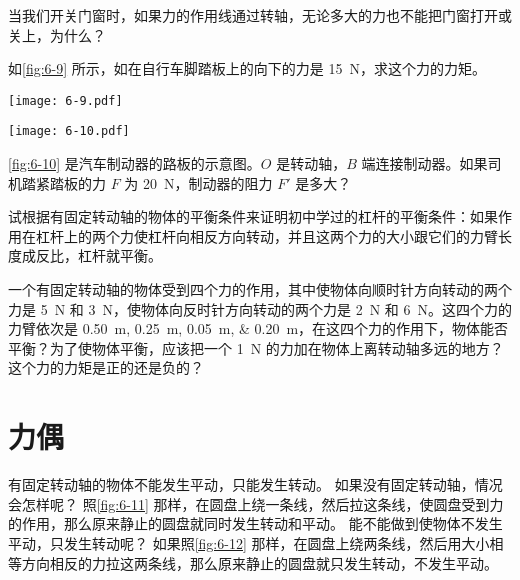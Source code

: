 \begin{Practice}
\begin{question}
  \item 当我们开关门窗时，如果力的作用线通过转轴，无论多大的力也不能把门窗打开或关上，为什么？
  \item 如\cref{fig:6-9} 所示，如在自行车脚踏板上的向下的力是 \qty{15}{N}，求这个力的力矩。
  \begin{figurehere}
  \begin{minipage}[b]{0.58\linewidth}\centering
    \texttt{[image: 6-9.pdf]}
    \caption{}\label{fig:6-9}
  \end{minipage}
  \begin{minipage}[b]{0.38\linewidth}\centering
    \texttt{[image: 6-10.pdf]}
    \caption{}\label{fig:6-10}
  \end{minipage}
  \end{figurehere}
  \item \cref{fig:6-10} 是汽车制动器的路板的示意图。$O$ 是转动轴，$B$ 端连接制动器。如果司机踏紧踏板的力 $F$ 为 \qty{20}{N}，制动器的阻力 $F'$ 是多大？
  \item 试根据有固定转动轴的物体的平衡条件来证明初中学过的杠杆的平衡条件：如果作用在杠杆上的两个力使杠杆向相反方向转动，并且这两个力的大小跟它们的力臂长度成反比，杠杆就平衡。
  \item 一个有固定转动轴的物体受到四个力的作用，其中使物体向顺时针方向转动的两个力是 \qty{5}{N} 和 \qty{3}{N}，使物体向反时针方向转动的两个力是 \qty{2}{N} 和 \qty{6}{N}。这四个力的力臂依次是 \qtylist{0.50;0.25;0.05;0.20}{m}，在这四个力的作用下，物体能否平衡？为了使物体平衡，应该把一个 \qty{1}{N} 的力加在物体上离转动轴多远的地方？这个力的力矩是正的还是负的？
\end{question}
\end{Practice}


\section{力偶}

有固定转动轴的物体不能发生平动，只能发生转动。
如果没有固定转动轴，情况会怎样呢？
照\cref{fig:6-11} 那样，在圆盘上绕一条线，然后拉这条线，使圆盘受到力的作用，那么原来静止的圆盘就同时发生转动和平动。
能不能做到使物体不发生平动，只发生转动呢？
如果照\cref{fig:6-12} 那样，在圆盘上绕两条线，然后用大小相等方向相反的力拉这两条线，那么原来静止的圆盘就只发生转动，不发生平动。

